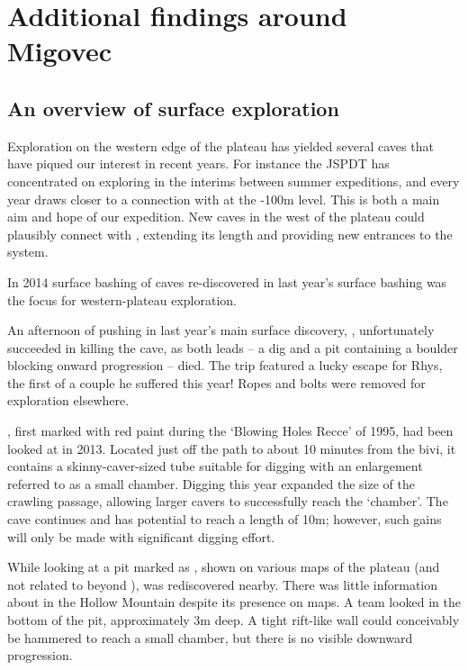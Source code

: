 \section{Additional findings around Migovec}

\subsection{An overview of surface exploration}

Exploration on the western edge of the plateau has yielded several caves that have piqued our interest in recent years. For instance the JSPDT has concentrated on exploring  in the interims between summer expeditions, and every year draws closer to a connection with  at the -100m level. This is both a main aim and hope of our expedition. New caves in the west of the plateau could plausibly connect with , extending its length and providing new entrances to the system.

In 2014 surface bashing of caves re-discovered in last year’s surface bashing was the focus for western-plateau exploration.

An afternoon of pushing in last year’s main surface discovery, , unfortunately succeeded in killing the cave, as both leads – a dig and a pit containing a boulder blocking onward progression – died. The trip featured a lucky escape for Rhys, the first of a couple he suffered this year! Ropes and bolts were removed for exploration elsewhere.

, first marked with red paint during the ‘Blowing Holes Recce’ of 1995, had been looked at in 2013. Located just off the path to  about 10 minutes from the bivi, it contains a skinny-caver-sized tube suitable for digging with an enlargement referred to as a small chamber. Digging this year expanded the size of the crawling passage, allowing larger cavers to successfully reach the ‘chamber’. The cave continues and  has potential to reach a length of 10m; however, such gains will only be made with significant digging effort. 

While looking at  a pit marked as , shown on various maps of the plateau (and not related to  beyond ), was rediscovered nearby. There was little information about  in the Hollow Mountain despite its presence on maps. A team looked in the bottom of the pit, approximately 3m deep. A tight rift-like wall could conceivably be hammered to reach a small chamber, but there is no visible downward progression. 

